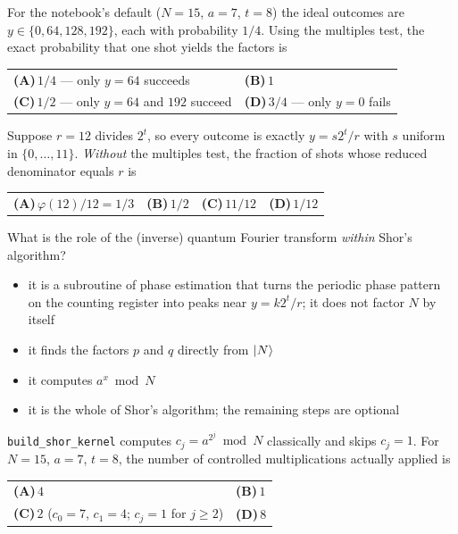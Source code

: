 \documentclass[11pt,a4paper]{article}
\newcommand{\optlabel}[1]{\textbf{(#1)}}
\newenvironment{qitem}[1]{\begin{list}{}{\setlength{\leftmargin}{3.3em}\setlength{\labelwidth}{3.1em}%
  \setlength{\labelsep}{0.2em}\setlength{\topsep}{3pt}\setlength{\parsep}{3pt}}\item[\textbf{Q.#1}\hfill]}{\end{list}}
\newcommand{\qsep}{\par\vspace{2pt}{\color{black!15}\hrule}\vspace{4pt}}
\begin{document}
\begin{qitem}{51}
For the notebook's default ($N = 15$, $a = 7$, $t = 8$) the ideal outcomes are $y \in \{0, 64, 128, 192\}$, each with probability $1/4$. Using the
multiples test, the exact probability that one shot yields the factors is
\par\smallskip\noindent\begin{tabularx}{\linewidth}{@{}*{2}{L}@{}}
\optlabel{A}\,$1/4$ --- only $y = 64$ succeeds & \optlabel{B}\,$1$ \\[3pt]
\optlabel{C}\,$1/2$ --- only $y = 64$ and $192$ succeed & \optlabel{D}\,$3/4$ --- only $y = 0$ fails
\end{tabularx}
\end{qitem}
\qsep

\begin{qitem}{52}
Suppose $r = 12$ divides $2^t$, so every outcome is exactly $y = s2^t/r$ with $s$ uniform in $\{0, \dots, 11\}$. \emph{Without} the multiples test,
the fraction of shots whose reduced denominator equals $r$ is
\par\smallskip\noindent\begin{tabularx}{\linewidth}{@{}*{4}{L}@{}}
\optlabel{A}\,$\varphi(12)/12 = 1/3$ & \optlabel{B}\,$1/2$ & \optlabel{C}\,$11/12$ & \optlabel{D}\,$1/12$
\end{tabularx}
\end{qitem}
\qsep

\begin{qitem}{53}
What is the role of the (inverse) quantum Fourier transform \emph{within} Shor's algorithm?
\begin{itemize}[leftmargin=2.6em, labelsep=0.4em, itemsep=2pt, topsep=3pt]
\item[\optlabel{A}] it is a subroutine of phase estimation that turns the periodic phase pattern on the counting register into peaks near $y = k2^t/r$; it does not factor $N$ by itself
\item[\optlabel{B}] it finds the factors $p$ and $q$ directly from $\ket N$
\item[\optlabel{C}] it computes $a^x \bmod N$
\item[\optlabel{D}] it is the whole of Shor's algorithm; the remaining steps are optional
\end{itemize}
\end{qitem}
\qsep

\begin{qitem}{54}
\texttt{build\_shor\_kernel} computes $c_j = a^{2^j} \bmod N$ classically and skips $c_j = 1$. For $N = 15$, $a = 7$, $t = 8$, the number of controlled
multiplications actually applied is
\par\smallskip\noindent\begin{tabularx}{\linewidth}{@{}*{2}{L}@{}}
\optlabel{A}\,$4$ & \optlabel{B}\,$1$ \\[3pt]
\optlabel{C}\,$2$ ($c_0 = 7$, $c_1 = 4$; $c_j = 1$ for $j \ge 2$) & \optlabel{D}\,$8$
\end{tabularx}
\end{qitem}
\qsep
\end{document}
